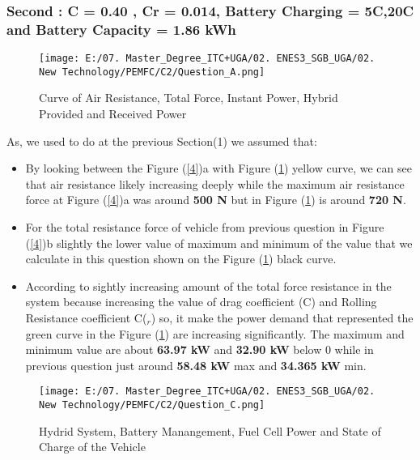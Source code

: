 \documentclass[12pt,a4paper]{article}
\numberwithin{equation}{section}
\begin{document}
\subsubsection{Second : C = 0.40 , Cr = 0.014, Battery Charging = 5C,20C and Battery Capacity = 1.86 kWh}




\begin{figure}[h]
	\centering 
	\texttt{[image: E:/07. Master\_Degree\_ITC+UGA/02. ENES3\_SGB\_UGA/02. New Technology/PEMFC/C2/Question\_A.png]}
	\caption{\small {Curve of Air Resistance, Total Force, Instant Power, Hybrid Provided and Received Power}}
	\label{22}
\end{figure}
As, we used to do at the previous Section(1) we assumed that:
\begin{itemize}
	\item By looking between the Figure (\ref{4})a with Figure (\ref{22}) yellow curve, we can see that air resistance likely increasing deeply while the maximum air resistance force at Figure (\ref{4})a was around \textbf{500 N} but in Figure (\ref{22}) is around \textbf{720 N}.
	\item For the total resistance force of vehicle from previous question in Figure (\ref{4})b slightly the lower value of maximum and minimum of the value that we calculate in this question shown on the Figure (\ref{22}) black curve. 
	\item According to sightly increasing amount of the total force resistance in the system because increasing the value of drag coefficient (C) and Rolling Resistance coefficient C($_r$) so, it make the power demand that represented the green curve in the Figure (\ref{22}) are increasing significantly. The maximum and minimum value are about \textbf{63.97 kW} and \textbf{32.90 kW} below 0 while in previous question just around \textbf{58.48 kW} max and \textbf{34.365 kW} min.

\end{itemize}


\begin{figure}[h]
	\centering 
	\texttt{[image: E:/07. Master\_Degree\_ITC+UGA/02. ENES3\_SGB\_UGA/02. New Technology/PEMFC/C2/Question\_C.png]}
	\caption{\small {Hydrid System, Battery Manangement, Fuel Cell Power and State of Charge of the Vehicle}}
	\label{23}
\end{figure}
\end{document}
